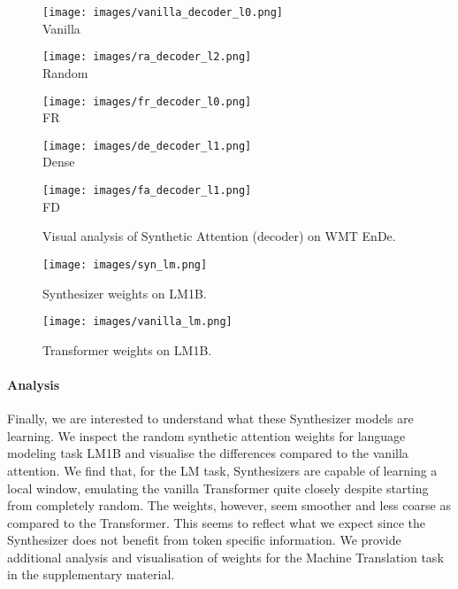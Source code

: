 \documentclass{article}
\begin{document}
\begin{figure}[H]
\begin{minipage}{0.18\linewidth}
  \centering
     \texttt{[image: images/vanilla\_decoder\_l0.png]}
    \\ {Vanilla}
    \label{fig:sortiter}
\end{minipage}\hfill
\begin{minipage}{0.18\linewidth}
  \centering
     \texttt{[image: images/ra\_decoder\_l2.png]}
    \\ {Random}
    \label{fig:sortiter}
\end{minipage}\hfill
\begin{minipage}{0.18\linewidth}
  \centering
    \texttt{[image: images/fr\_decoder\_l0.png]}
    \\ {FR}
    \label{fig:temperature}
\end{minipage}\hfill
\begin{minipage}{0.18\linewidth}
  \centering
     \texttt{[image: images/de\_decoder\_l1.png]}
    \\ {Dense}
    \label{fig:sortiter}
\end{minipage}
\begin{minipage}{0.18\linewidth}
  \centering
     \texttt{[image: images/fa\_decoder\_l1.png]}
    \\ {FD}
    \label{fig:sortiter}
\end{minipage}\hfill 
\label{fig:analysis}
\caption{Visual analysis of Synthetic Attention (decoder) on WMT EnDe.}
\end{figure}

\begin{figure}
\begin{minipage}{0.48\linewidth}
 \centering
     \texttt{[image: images/syn\_lm.png]}
    \caption{Synthesizer weights on LM1B.}
    \label{fig:synlm}
\end{minipage}
\begin{minipage}{0.48\linewidth}
 \centering
     \texttt{[image: images/vanilla\_lm.png]}
    \caption{Transformer weights on LM1B.}
    \label{fig:synlm}
\end{minipage}
\end{figure}

\paragraph{Analysis} Finally, we are interested to understand what these Synthesizer models are learning. We inspect the random synthetic attention weights for language modeling task LM1B and visualise the differences compared to the vanilla attention. We find that, for the LM task, Synthesizers are capable of learning a local window, emulating the vanilla Transformer quite closely despite starting from completely random. The weights, however, seem smoother and less coarse as compared to the Transformer. This seems to reflect what we expect since the Synthesizer does not benefit from token specific information. We provide additional analysis and visualisation of weights for the Machine Translation task in the supplementary material.
\end{document}
